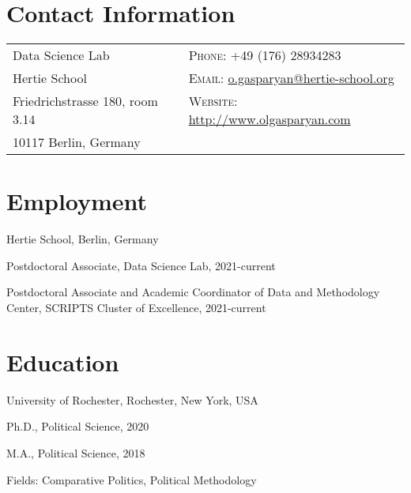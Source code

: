 \documentclass[margin,line,10.95pt]{res}
\newenvironment{list1}{
  \begin{list}{\ding{113}}{%
      \setlength{\itemsep}{0in}
      \setlength{\parsep}{0in} \setlength{\parskip}{0in}
      \setlength{\topsep}{0in} \setlength{\partopsep}{0in}
      \setlength{\leftmargin}{0.17in}}}{\end{list}}
\begin{document}

\begin{resume}
\section{\sc Contact Information}
\vspace{.05in}
\begin{tabular}{@{}p{2.5in}p{4in}}
Data Science Lab                 & \textsc{Phone}: +49 (176) 28934283 \\
  Hertie School  & \textsc{Email}: \href{mailto:o.gasparyan@hertie-school.org}{o.gasparyan@hertie-school.org} \\
Friedrichstrasse 180, room 3.14              & \textsc{Website}: \href{http://www.olgasparyan.com}{http://www.olgasparyan.com} \\
10117 Berlin, Germany        \\
\end{tabular}

\section{\sc Employment}
{Hertie School}, Berlin, Germany\\
\vspace*{-.1in}
\begin{list1}
	\item[] Postdoctoral Associate, Data Science Lab, 2021-current
	\item[] Postdoctoral Associate and Academic Coordinator of Data and Methodology Center, SCRIPTS Cluster of Excellence, 2021-current

\end{list1}

\section{\sc Education}
{University of Rochester}, Rochester, New York, USA\\
\vspace*{-.1in}
\begin{list1}
\item[] Ph.D., Political Science, 2020 
\item[] M.A., Political Science, 2018 
\item[] Fields: Comparative Politics, Political Methodology 
\end{list1}


\end{resume}
\end{document}
